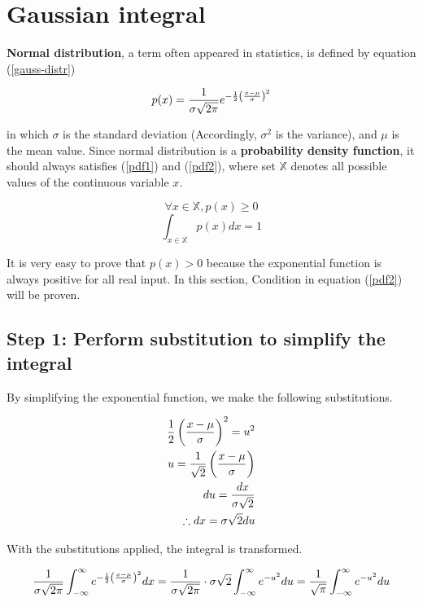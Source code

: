 \section{Gaussian integral}

\textbf{Normal distribution}, a term often appeared in statistics, is defined
by equation (\ref{gauss-distr})

\begin{equation}
	p(x)={1\over\sigma\sqrt{2\pi}}
	e^{-\frac12\left(x-\mu\over\sigma\right)^2}
	\label{gauss-distr}
\end{equation}

in which $\sigma$ is the standard deviation (Accordingly, $\sigma^2$ is the
variance), and $\mu$ is the mean value. Since normal distribution is a
\textbf{probability density function}, it should always satisfies (\ref{pdf1})
and (\ref{pdf2}), where set $\mathbb{X}$ denotes all possible values of the
continuous variable $x$.

\begin{equation}
	\forall x\in\mathbb{X},p(x)\ge0
	\label{pdf1}
\end{equation}
\begin{equation}
	\int_{x\in\mathbb{X}} p(x)dx=1
	\label{pdf2}
\end{equation}

It is very easy to prove that $p(x)>0$ because the exponential function is
always positive for all real input. In this section, Condition in equation
(\ref{pdf2}) will be proven.

\subsection{Step 1: Perform substitution to simplify the integral}

By simplifying the exponential function, we make the following substitutions.

$$
\begin{aligned}
	\frac12\left(x-\mu\over\sigma\right)^2=u^2 \\
	u={1\over\sqrt2}\left(x-\mu\over\sigma\right) \\
	du={dx\over\sigma\sqrt2} \\
	\therefore dx=\sigma\sqrt2du
\end{aligned}
$$

With the substitutions applied, the integral is transformed.

\begin{equation}
	{1\over\sigma\sqrt{2\pi}}\int_{-\infty}^\infty
	e^{-\frac12\left(x-\mu\over\sigma\right)^2}dx=
	{1\over\sigma\sqrt{2\pi}}\cdot\sigma\sqrt2\int_{-\infty}^\infty
	e^{-u^2}du
	={1\over\sqrt\pi}\int_{-\infty}^\infty e^{-u^2}du
	\label{gauss-distr-int}
\end{equation}

